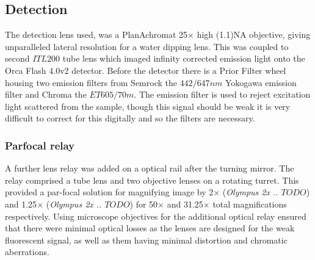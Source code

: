 
\subsection{Detection}

The detection lens used, was a PlanAchromat \SI{25}{}$\times$ high (\SI{1.1}{})\acrshort{NA} objective, giving unparalleled lateral resolution for a water dipping lens.
This was coupled to second $ITL200$ tube lens which imaged infinity corrected emission light onto the Orca Flash 4.0v2 detector.
Before the detector there is a Prior Filter wheel housing two emission filters from Semrock the $442/647 nm$ Yokogawa emission filter and Chroma the $ET605/70m$.
The emission filter is used to reject excitation light scattered from the sample, though this signal should be weak it is very difficult to correct for this digitally and so the filters are necessary.

\subsubsection{Parfocal relay}

A further lens relay was added on a optical rail after the turning mirror.
The relay comprised a tube lens and two objective lenses on a rotating turret.
This provided a par-focal solution for magnifying image by 2$\times$ (\emph{Olympus 2x .. $TODO$}) and 1.25$\times$ (\emph{Olympus 2x .. $TODO$}) for 50$\times$ and 31.25$\times$ total magnifications respectively.
Using microscope objectives for the additional optical relay ensured that there were minimal optical losses as the lenses are designed for the weak fluorescent signal, as well as them having minimal distortion and chromatic aberrations.

